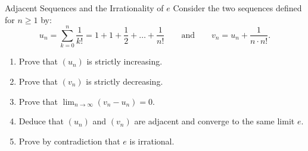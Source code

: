 \begin{exercise}{Adjacent Sequences and the Irrationality of $e$}
Consider the two sequences defined for $n \ge 1$ by:
\[
u_n = \sum_{k=0}^n \frac{1}{k!} = 1 + 1 + \frac{1}{2} + \dots + \frac{1}{n!} \qquad \text{and} \qquad v_n = u_n + \frac{1}{n \cdot n!}.
\]
\begin{enumerate}[leftmargin=1.5em,itemsep=2pt]
  \item Prove that $(u_n)$ is strictly increasing.
  \item Prove that $(v_n)$ is strictly decreasing.
  \item Prove that $\lim_{n \to \infty} (v_n - u_n) = 0$.
  \item Deduce that $(u_n)$ and $(v_n)$ are adjacent and converge to the same limit $e$.
  \item Prove by contradiction that $e$ is irrational.
\end{enumerate}
\end{exercise}

\begin{tabletworkspace}[5.5cm]
\end{tabletworkspace}

